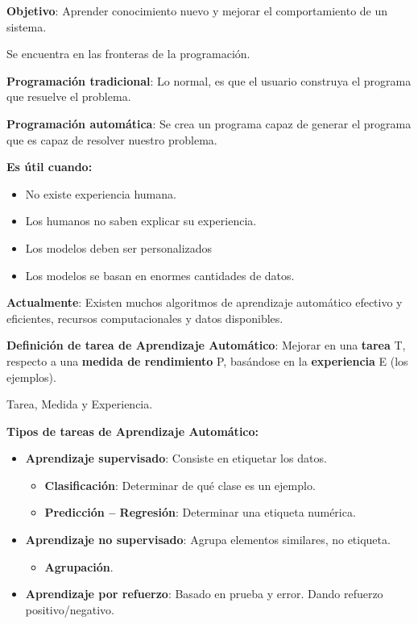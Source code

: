 \documentclass[12pt, twoside, openright]{report} %
\begin{document}
\textbf{Objetivo}: Aprender conocimiento nuevo y mejorar el comportamiento de un sistema.

Se encuentra en las fronteras de la programación.

\textbf{Programación tradicional}: Lo normal, es que el usuario construya el programa que resuelve el problema.

\textbf{Programación automática}: Se crea un programa capaz de generar
el programa que es capaz de resolver nuestro problema.

\textbf{Es útil cuando:}

\begin{itemize}
	\item No existe experiencia humana.
	\item Los humanos no saben explicar su experiencia.
	\item Los modelos deben ser personalizados
	\item Los modelos se basan en enormes cantidades de datos.
\end{itemize}

\textbf{Actualmente}: Existen muchos algoritmos de aprendizaje
automático efectivo y eficientes, recursos computacionales y datos
disponibles.

\textbf{Definición de tarea de Aprendizaje Automático}: Mejorar en una
\textbf{tarea} T, respecto a una \textbf{medida de rendimiento} P,
basándose en la \textbf{experiencia} E (los ejemplos).

Tarea, Medida y Experiencia.

\textbf{Tipos de tareas de Aprendizaje Automático:}
\begin{itemize}
	\item \textbf{Aprendizaje supervisado}: Consiste en etiquetar los datos.

	      \begin{itemize}
		      \item \textbf{Clasificación}: Determinar de qué clase es un ejemplo.
		      \item \textbf{Predicción -- Regresión}: Determinar una etiqueta numérica.

	      \end{itemize}
		  \pagebreak
	\item \textbf{Aprendizaje no supervisado}: Agrupa elementos similares, no
	      etiqueta.

	      \begin{itemize}
		      \item \textbf{Agrupación}.
	      \end{itemize}
	\item \textbf{Aprendizaje por refuerzo}: Basado en prueba y error. Dando
	      refuerzo positivo/negativo.
\end{itemize}
\end{document}
